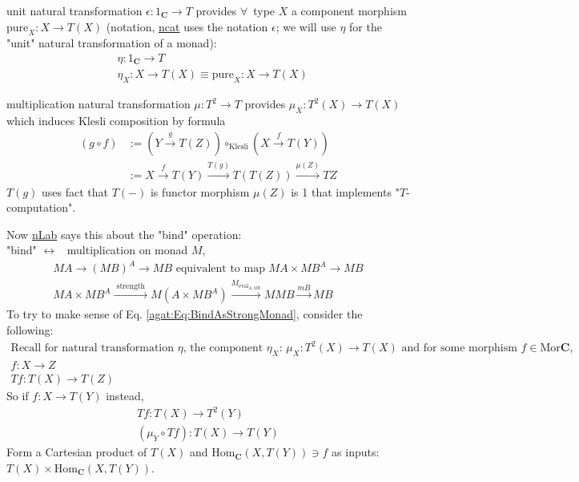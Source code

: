 unit natural transformation $\epsilon:1_{\mathbf{C}} \to T$ provides $\forall \,$ type $X$ a component morphism $\text{pure}_X :X \to T(X)$ (notation, \href{https://ncatlab.org/nlab/show/monad+%28in+computer+science%29}{ncat} uses the notation $\epsilon$; we will use $\eta$ for the "unit" natural transformation of a monad):
	\[
		\begin{aligned}
		&  \eta : 1_{\mathbf{C}} \to T \\ 
		& \eta_X : X\to T(X) \equiv \text{pure}_X : X \to T(X)
		\end{aligned}	
	\]

multiplication natural transformation $\mu :T^2 \to T$ provides $\mu_X : T^2(X) \to T(X)$ which induces Klesli composition by formula
\begin{equation}
\begin{aligned} 
	(g\circ f) & := (Y \xrightarrow{g} T(Z)) \circ_{\text{Klesli}} (X\xrightarrow{f} T(Y)) \\
	& := X \xrightarrow{f} T(Y) \xrightarrow{T(g)} T(T(Z)) \xrightarrow{ \mu(Z) } TZ
\end{aligned} 
\end{equation}
$T(g)$ uses fact that $T(-)$ is functor morphism $\mu(Z)$ is 1 that implements "$T$-computation".

Now \href{https://ncatlab.org/nlab/show/monad+%28in+computer+science%29}{nLab} says this about the "bind" operation: \\
	"bind" \quad $\leftrightarrow$ \, multiplication on monad $M$, \\
	\begin{equation}\label{agat:Eq:BindAsStrongMonad}
	\begin{gathered} 
	MA \to (MB)^A \to MB \text{ equivalent to map } MA \times MB^A \to MB \\ 
	 MA \times MB^A \xrightarrow{ \text{ strength } } M(A\times MB^A) \xrightarrow{ M_{\text{eval}_{A, MB} } } MMB \xrightarrow{ mB } MB
	\end{gathered} 
	\end{equation}
To try to make sense of Eq. \ref{agat:Eq:BindAsStrongMonad}, consider the following: 
\[
\begin{gathered}
\text{Recall for natural transformation $\eta$, the component $\eta_X$: } \mu_X : T^2(X) \to T(X) \text{ and for some morphism $f \in \text{Mor}{\mathbf{C}}$}, \\
	f:X\to Z \\
	Tf:T(X) \to T(Z)
\end{gathered} 
\]
So if $f:X\to T(Y)$ instead, 
\[
\begin{gathered}
Tf:T(X) \to T^2(Y) \\ 
(\mu_Y \circ Tf) : T(X) \to T(Y)
\end{gathered} 
\]
Form a Cartesian product of $T(X)$ and $\text{Hom}_{\mathbf{C}}(X,T(Y)) \ni f$ as inputs: $T(X) \times \text{Hom}_{\mathbf{C}}(X, T(Y))$. \\

